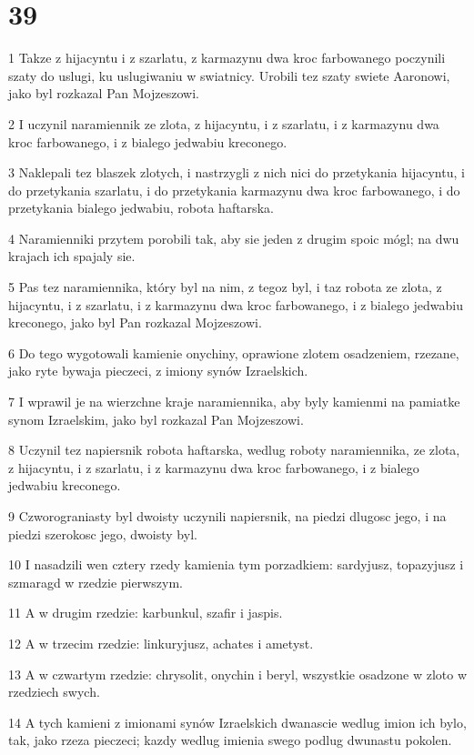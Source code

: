 \chapter{39}

\par 1 Takze z hijacyntu i z szarlatu, z karmazynu dwa kroc farbowanego poczynili szaty do uslugi, ku uslugiwaniu w swiatnicy. Urobili tez szaty swiete Aaronowi, jako byl rozkazal Pan Mojzeszowi.
\par 2 I uczynil naramiennik ze zlota, z hijacyntu, i z szarlatu, i z karmazynu dwa kroc farbowanego, i z bialego jedwabiu kreconego.
\par 3 Naklepali tez blaszek zlotych, i nastrzygli z nich nici do przetykania hijacyntu, i do przetykania szarlatu, i do przetykania karmazynu dwa kroc farbowanego, i do przetykania bialego jedwabiu, robota haftarska.
\par 4 Naramienniki przytem porobili tak, aby sie jeden z drugim spoic mógl; na dwu krajach ich spajaly sie.
\par 5 Pas tez naramiennika, który byl na nim, z tegoz byl, i taz robota ze zlota, z hijacyntu, i z szarlatu, i z karmazynu dwa kroc farbowanego, i z bialego jedwabiu kreconego, jako byl Pan rozkazal Mojzeszowi.
\par 6 Do tego wygotowali kamienie onychiny, oprawione zlotem osadzeniem, rzezane, jako ryte bywaja pieczeci, z imiony synów Izraelskich.
\par 7 I wprawil je na wierzchne kraje naramiennika, aby byly kamienmi na pamiatke synom Izraelskim, jako byl rozkazal Pan Mojzeszowi.
\par 8 Uczynil tez napiersnik robota haftarska, wedlug roboty naramiennika, ze zlota, z hijacyntu, i z szarlatu, i z karmazynu dwa kroc farbowanego, i z bialego jedwabiu kreconego.
\par 9 Czworograniasty byl dwoisty uczynili napiersnik, na piedzi dlugosc jego, i na piedzi szerokosc jego, dwoisty byl.
\par 10 I nasadzili wen cztery rzedy kamienia tym porzadkiem: sardyjusz, topazyjusz i szmaragd w rzedzie pierwszym.
\par 11 A w drugim rzedzie: karbunkul, szafir i jaspis.
\par 12 A w trzecim rzedzie: linkuryjusz, achates i ametyst.
\par 13 A w czwartym rzedzie: chrysolit, onychin i beryl, wszystkie osadzone w zloto w rzedziech swych.
\par 14 A tych kamieni z imionami synów Izraelskich dwanascie wedlug imion ich bylo, tak, jako rzeza pieczeci; kazdy wedlug imienia swego podlug dwunastu pokolen.
